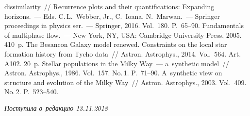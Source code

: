 \begin{multicols}{2}
{{\begin{thebibliography}{99}
dissimilarity~//  Recurrence plots and their quantifications: Expanding horizons.~--- 
Eds. C.\,L.~Webber, Jr., C.~Ioana, N.~Marwan.~--- Springer 
proceedings in physics ser.~--- Springer, 2016. Vol.~180. P.~65--90.
   Fundamentals of multiphase flow.~--- New York, NY, USA: Cambridge 
University Press, 2005. 410~p.
   The Besancon Galaxy model 
renewed. Constraints on the local star formation history from Tycho data~// Astron.  
Astrophys., 2014. Vol.~564. Art.\,A102. 20~p.
   Stellar populations in the Milky Way~--- a~synthetic model~// 
Astron. Astrophys., 1986. Vol.~157. No.\,1. P.~71--90.
   A~synthetic view on structure and evolution of 
the Milky Way~// Astron. Astrophys., 2003. Vol.~409. No.\,2. P.~523--540.
      

\end{thebibliography}
} }

\end{multicols}

 \label{end\stat}

 \vspace*{-9pt}

\hfill{\small\textit{Поступила в~редакцию 13.11.2018}}


\renewcommand{\figurename}{\protect\bf Рис.}
\renewcommand{\tablename}{\protect\bf Таблица}
      